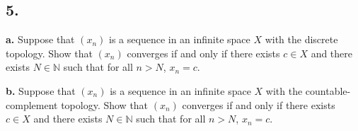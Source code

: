 \documentclass{amsart}
\theoremstyle{plain}
\theoremstyle{definition}
\theoremstyle{remark}
\begin{document}
\vspace{.15in}

\noindent
\subsection*{5.}

{\bfseries a.} Suppose that $(x_n)$ is a sequence in an infinite space $X$ with the discrete topology. Show that $(x_n)$ converges if and only if there exists $c\in X$ and there exists $N\in \mathbb N$ such that for all $n > N$, $x_n = c$.


\vspace{.1in}
{\bfseries b.} Suppose that $(x_n)$ is a sequence in an infinite space $X$ with the countable-complement topology. Show that $(x_n)$ converges if and only if there exists $c\in X$ and there exists $N\in \mathbb N$ such that for all $n > N$, $x_n = c$.
\end{document}
